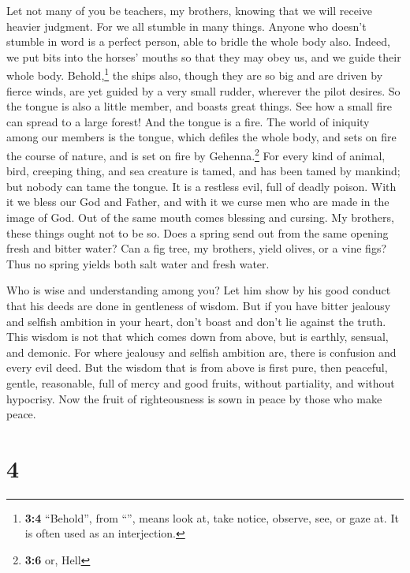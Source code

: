  Let not many of you be teachers, my brothers, knowing
that we will receive heavier judgment.  For we all stumble
in many things. Anyone who doesn't stumble in word is a perfect person,
able to bridle the whole body also.  Indeed, we put bits
into the horses' mouths so that they may obey us, and we guide their
whole body.  Behold,\footnote{\textbf{3:4} ``Behold'',
  from ``'', means look at, take notice, observe, see, or
  gaze at. It is often used as an interjection.} the ships also, though
they are so big and are driven by fierce winds, are yet guided by a very
small rudder, wherever the pilot desires.  So the tongue
is also a little member, and boasts great things. See how a small fire
can spread to a large forest!  And the tongue is a fire.
The world of iniquity among our members is the tongue, which defiles the
whole body, and sets on fire the course of nature, and is set on fire by
Gehenna.\footnote{\textbf{3:6} or, Hell}  For every kind
of animal, bird, creeping thing, and sea creature is tamed, and has been
tamed by mankind;  but nobody can tame the tongue. It is a
restless evil, full of deadly poison.  With it we bless
our God and Father, and with it we curse men who are made in the image
of God.  Out of the same mouth comes blessing and
cursing. My brothers, these things ought not to be so. 
Does a spring send out from the same opening fresh and bitter water?
 Can a fig tree, my brothers, yield olives, or a vine
figs? Thus no spring yields both salt water and fresh water.

 Who is wise and understanding among you? Let him show by
his good conduct that his deeds are done in gentleness of wisdom.
 But if you have bitter jealousy and selfish ambition in
your heart, don't boast and don't lie against the truth. 
This wisdom is not that which comes down from above, but is earthly,
sensual, and demonic.  For where jealousy and selfish
ambition are, there is confusion and every evil deed. 
But the wisdom that is from above is first pure, then peaceful, gentle,
reasonable, full of mercy and good fruits, without partiality, and
without hypocrisy.  Now the fruit of righteousness is
sown in peace by those who make peace.

\hypertarget{section-3}{%
\section{4}\label{section-3}}

